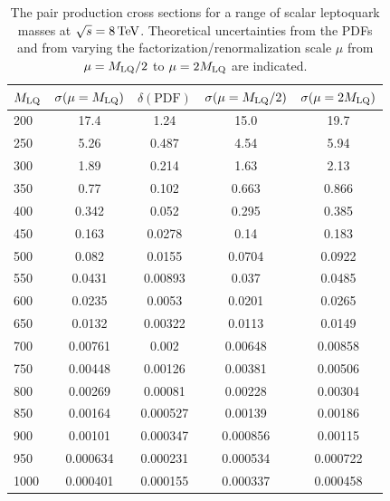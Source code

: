 \begin{table}[htb]
\begin{center}
{\footnotesize
\begin{tabular}{|l||c|c||c|c|}
\hline
$M_{\text{LQ}}$ & $\sigma (\mu = M_{\text{LQ}})$ & $\delta (\text{PDF}) $ & $\sigma (\mu = M_{\text{LQ}}/2)$ & $\sigma (\mu = 2M_{\text{LQ}})$ \\
\hline
\hline
 200 & 17.4 & 1.24 & 15.0 & 19.7  \\
 250 & 5.26 & 0.487 & 4.54 & 5.94  \\
 300 & 1.89 & 0.214 & 1.63 & 2.13  \\
 350 & 0.77 & 0.102 & 0.663 & 0.866  \\
 400 & 0.342 & 0.052 & 0.295 & 0.385  \\
 450 & 0.163 & 0.0278 & 0.14 & 0.183  \\
 500 & 0.082 & 0.0155 & 0.0704 & 0.0922  \\
 550 & 0.0431 & 0.00893 & 0.037 & 0.0485  \\
 600 & 0.0235 & 0.0053 & 0.0201 & 0.0265  \\
 650 & 0.0132 & 0.00322 & 0.0113 & 0.0149  \\
 700 & 0.00761 & 0.002 & 0.00648 & 0.00858  \\
 750 & 0.00448 & 0.00126 & 0.00381 & 0.00506  \\
 800 & 0.00269 & 0.00081 & 0.00228 & 0.00304  \\
 850 & 0.00164 & 0.000527 & 0.00139 & 0.00186  \\
 900 & 0.00101 & 0.000347 & 0.000856 & 0.00115  \\
 950 & 0.000634 & 0.000231 & 0.000534 & 0.000722  \\
 1000 & 0.000401 & 0.000155 & 0.000337 & 0.000458  \\
\hline
\end{tabular}
}
\caption{The pair production cross sections for a range of scalar leptoquark masses at $\sqrt{s}=8\,\text{Te\hspace{-.08em}V}$. Theoretical uncertainties from the PDFs and from varying the factorization/renormalization scale $\mu$ from $\mu=M_{\text{LQ}}/2$ to $\mu=2M_{\text{LQ}}$ are indicated.}
\label{tab:lq-xsec}
\end{center}
\end{table}

